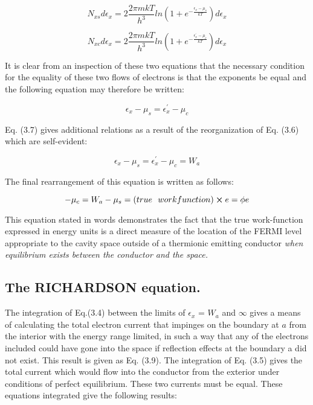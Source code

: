 \documentclass[11pt,a4paper]{article}
\begin{document}
	\begin{equation}
		N_{xs}d\epsilon_x = 2 \frac{2 \pi m k T}{h^3} ln(1+e^{-\frac{\epsilon_x- \mu_s}{k T}}) d\epsilon_x
	\end{equation}
	
	\begin{equation}
		N_{xc}d\epsilon_x = 2 \frac{2 \pi m k T}{h^3} ln(1+e^{-\frac{\epsilon_x^{'}- \mu_c}{k T}}) d\epsilon_x
	\end{equation}
	
	It is clear from an inspection of these two equations that the necessary condition for the equality of these two flows of electrons is that the exponents be
	equal and the following equation may therefore be written:
	
	\begin{equation}
		\epsilon_x- \mu_s = \epsilon_x^{'}- \mu_c
	\end{equation}
	
	Eq. (3.7) gives additional relations as a result of the reorganization of Eq. (3.6)
	which are self-evident:
	
	\begin{equation}
		\epsilon_x- \mu_s = \epsilon_x^{'}- \mu_c = W_a
	\end{equation}
	
	The final rearrangement of this equation is written as follows:
	
	\begin{equation}
		-\mu_c = W_a - \mu_s = (true ~~ workfunction) \cross e = \phi e
	\end{equation}
	
	This equation stated in words demonstrates the fact that the true work-function
	expressed in energy units is a direct measure of the location of the FERMI level
	appropriate to the cavity space outside of a thermionic emitting conductor \emph{
	when equilibrium exists between the conductor and the space.}
	
	\subsection{The RICHARDSON equation.}
	
	The integration of Eq.(3.4) between the
	limits of $\epsilon_x$  = $W_a$ and $\infty$ gives a means of calculating the total electron current
	that impinges on the boundary at $a$ from the interior with the energy range limited, in such a way that any of the electrons included could have gone into the
	space if reflection effects at the boundary a did not exist. This result is given
	as Eq. (3.9). The integration of Eq. (3.5) gives the total current which would
	flow into the conductor from the exterior under conditions of perfect equilibrium.
	These two currents must be equal. These equations integrated give the following results:
	
\end{document}
